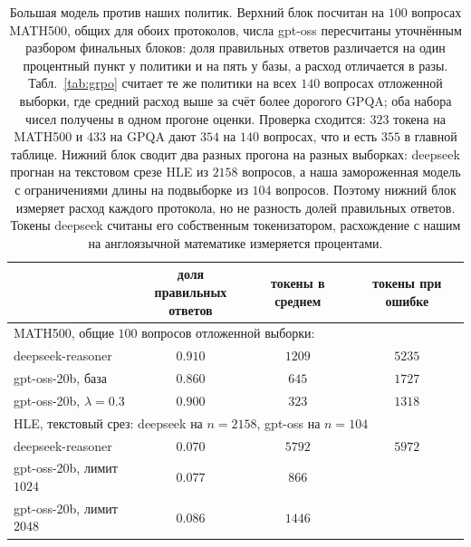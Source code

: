 \documentclass[11pt]{article}
\begin{document}
\begin{table}[t]
\centering
\begin{tabular}{lccc}
\toprule
 & \shortstack{доля правильных\\ответов} & токены в среднем & токены при ошибке \\
\midrule
\multicolumn{4}{l}{MATH500, общие $100$ вопросов отложенной выборки:}\\
deepseek-reasoner        & $0.910$ & $1209$ & $5235$ \\
gpt-oss-20b, база        & $0.860$ & $645$  & $1727$ \\
gpt-oss-20b, $\lambda{=}0.3$ & $0.900$ & $323$ & $1318$ \\
\midrule
\multicolumn{4}{l}{HLE, текстовый срез: deepseek на $n{=}2158$, gpt-oss на $n{=}104$}\\
deepseek-reasoner        & $0.070$ & $5792$ & $5972$ \\
gpt-oss-20b, лимит $1024$ & $0.077$ & $866$ &  \\
gpt-oss-20b, лимит $2048$ & $0.086$ & $1446$ &  \\
\bottomrule
\end{tabular}
\caption{Большая модель против наших политик. Верхний блок посчитан на $100$ вопросах MATH500, общих для обоих протоколов, числа gpt-oss пересчитаны уточнённым разбором финальных блоков: доля правильных ответов различается на один процентный пункт у политики и на пять у базы, а расход отличается в разы. Табл.~\ref{tab:grpo} считает те же политики на всех $140$ вопросах отложенной выборки, где средний расход выше за счёт более дорогого GPQA; оба набора чисел получены в одном прогоне оценки. Проверка сходится: $323$ токена на MATH500 и $433$ на GPQA дают $354$ на $140$ вопросах, что и есть $355$ в главной таблице. Нижний блок сводит два разных прогона на разных выборках: deepseek прогнан на текстовом срезе HLE из $2158$ вопросов, а наша замороженная модель с ограничениями длины на подвыборке из $104$ вопросов. Поэтому нижний блок измеряет расход каждого протокола, но не разность долей правильных ответов. Токены deepseek считаны его собственным токенизатором, расхождение с нашим на англоязычной математике измеряется процентами.}
\label{tab:h1}
\end{table}
\end{document}
